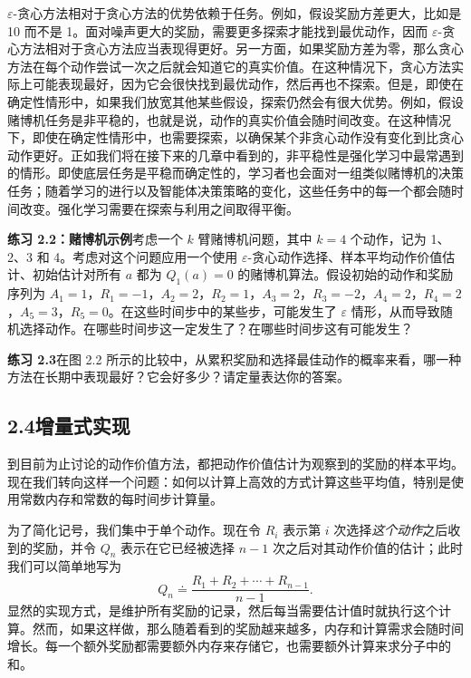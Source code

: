 \documentclass[UTF8,12pt,a4paper,fontset=fandol]{ctexart}
\begin{document}
$\varepsilon$-贪心方法相对于贪心方法的优势依赖于任务。例如，假设奖励方差更大，比如是 10 而不是 1。面对噪声更大的奖励，需要更多探索才能找到最优动作，因而 $\varepsilon$-贪心方法相对于贪心方法应当表现得更好。另一方面，如果奖励方差为零，那么贪心方法在每个动作尝试一次之后就会知道它的真实价值。在这种情况下，贪心方法实际上可能表现最好，因为它会很快找到最优动作，然后再也不探索。但是，即使在确定性情形中，如果我们放宽其他某些假设，探索仍然会有很大优势。例如，假设赌博机任务是非平稳的，也就是说，动作的真实价值会随时间改变。在这种情况下，即使在确定性情形中，也需要探索，以确保某个非贪心动作没有变化到比贪心动作更好。正如我们将在接下来的几章中看到的，非平稳性是强化学习中最常遇到的情形。即使底层任务是平稳而确定性的，学习者也会面对一组类似赌博机的决策任务；随着学习的进行以及智能体决策策略的变化，这些任务中的每一个都会随时间改变。强化学习需要在探索与利用之间取得平衡。

\noindent\textbf{练习 2.2：赌博机示例}\quad 考虑一个 $k$ 臂赌博机问题，其中 $k=4$ 个动作，记为 1、2、3 和 4。考虑对这个问题应用一个使用 $\varepsilon$-贪心动作选择、样本平均动作价值估计、初始估计对所有 $a$ 都为 $Q_1(a)=0$ 的赌博机算法。假设初始的动作和奖励序列为 $A_1=1$，$R_1=-1$，$A_2=2$，$R_2=1$，$A_3=2$，$R_3=-2$，$A_4=2$，$R_4=2$，$A_5=3$，$R_5=0$。在这些时间步中的某些步，可能发生了 $\varepsilon$ 情形，从而导致随机选择动作。在哪些时间步这一定发生了？在哪些时间步这有可能发生？

\noindent\textbf{练习 2.3}\quad 在图 2.2 所示的比较中，从累积奖励和选择最佳动作的概率来看，哪一种方法在长期中表现最好？它会好多少？请定量表达你的答案。

\subsection*{2.4\quad 增量式实现}

到目前为止讨论的动作价值方法，都把动作价值估计为观察到的奖励的样本平均。现在我们转向这样一个问题：如何以计算上高效的方式计算这些平均值，特别是使用常数内存和常数的每时间步计算量。

为了简化记号，我们集中于单个动作。现在令 $R_i$ 表示第 $i$ 次选择\textit{这个动作}之后收到的奖励，并令 $Q_n$ 表示在它已经被选择 $n-1$ 次之后对其动作价值的估计；此时我们可以简单地写为
\[
Q_n\doteq \frac{R_1+R_2+\cdots+R_{n-1}}{n-1}.
\]
显然的实现方式，是维护所有奖励的记录，然后每当需要估计值时就执行这个计算。然而，如果这样做，那么随着看到的奖励越来越多，内存和计算需求会随时间增长。每一个额外奖励都需要额外内存来存储它，也需要额外计算来求分子中的和。
\end{document}
